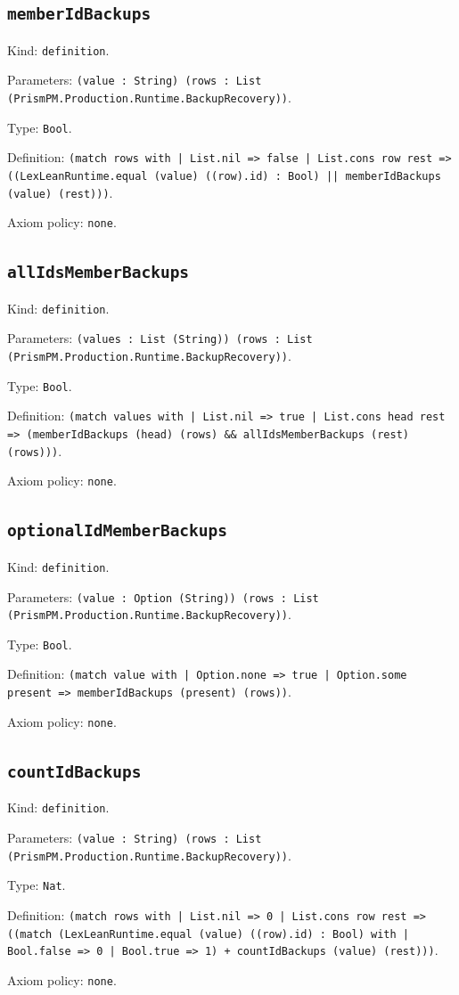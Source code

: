 \documentclass[11pt]{article}
\begin{document}
\subsection*{\texttt{memberIdBackups}}
\noindent Kind: \texttt{definition}.\par
\noindent Parameters: \texttt{(value : String) (rows : List (PrismPM.Production.Runtime.BackupRecovery))}.\par
\noindent Type: \texttt{Bool}.\par
\noindent Definition: \texttt{(match rows with | List.nil => false | List.cons row rest => ((LexLeanRuntime.equal (value) ((row).id) : Bool) || memberIdBackups (value) (rest)))}.\par
\noindent Axiom policy: \texttt{none}.\par
\subsection*{\texttt{allIdsMemberBackups}}
\noindent Kind: \texttt{definition}.\par
\noindent Parameters: \texttt{(values : List (String)) (rows : List (PrismPM.Production.Runtime.BackupRecovery))}.\par
\noindent Type: \texttt{Bool}.\par
\noindent Definition: \texttt{(match values with | List.nil => true | List.cons head rest => (memberIdBackups (head) (rows) \&\& allIdsMemberBackups (rest) (rows)))}.\par
\noindent Axiom policy: \texttt{none}.\par
\subsection*{\texttt{optionalIdMemberBackups}}
\noindent Kind: \texttt{definition}.\par
\noindent Parameters: \texttt{(value : Option (String)) (rows : List (PrismPM.Production.Runtime.BackupRecovery))}.\par
\noindent Type: \texttt{Bool}.\par
\noindent Definition: \texttt{(match value with | Option.none => true | Option.some present => memberIdBackups (present) (rows))}.\par
\noindent Axiom policy: \texttt{none}.\par
\subsection*{\texttt{countIdBackups}}
\noindent Kind: \texttt{definition}.\par
\noindent Parameters: \texttt{(value : String) (rows : List (PrismPM.Production.Runtime.BackupRecovery))}.\par
\noindent Type: \texttt{Nat}.\par
\noindent Definition: \texttt{(match rows with | List.nil => 0 | List.cons row rest => ((match (LexLeanRuntime.equal (value) ((row).id) : Bool) with | Bool.false => 0 | Bool.true => 1) + countIdBackups (value) (rest)))}.\par
\noindent Axiom policy: \texttt{none}.\par
\end{document}
